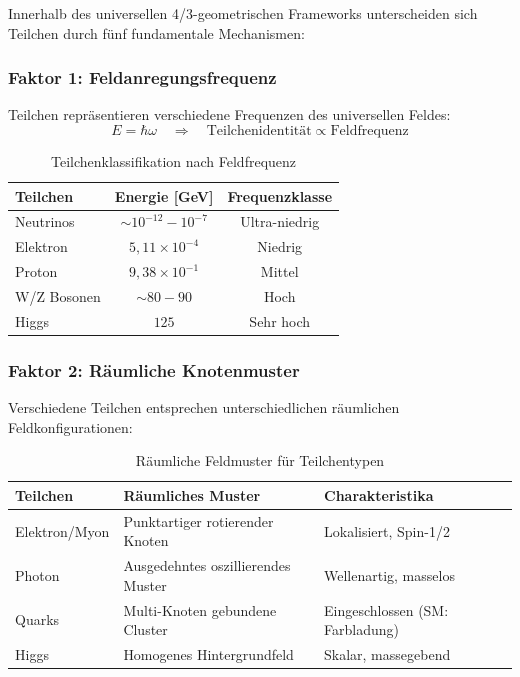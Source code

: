 	Innerhalb des universellen 4/3-geometrischen Frameworks unterscheiden sich Teilchen durch fünf fundamentale Mechanismen:
	
	\subsubsection{Faktor 1: Feldanregungsfrequenz}
	\label{subsubsec:anregungsfrequenz}
	
	Teilchen repräsentieren verschiedene Frequenzen des universellen Feldes:
	\begin{equation}
		E = \hbar \omega \quad \Rightarrow \quad \text{Teilchenidentität} \propto \text{Feldfrequenz}
		\label{eq:frequenz_identitaet}
	\end{equation}
	
	\begin{table}[htbp]
		\centering
		\begin{tabular}{lcc}
			\toprule
			\textbf{Teilchen} & \textbf{Energie [GeV]} & \textbf{Frequenzklasse} \\
			\midrule
			Neutrinos & $\sim 10^{-12} - 10^{-7}$ & Ultra-niedrig \\
			Elektron & $5{,}11 \times 10^{-4}$ & Niedrig \\
			Proton & $9{,}38 \times 10^{-1}$ & Mittel \\
			W/Z Bosonen & $\sim 80-90$ & Hoch \\
			Higgs & $125$ & Sehr hoch \\
			\bottomrule
		\end{tabular}
		\caption{Teilchenklassifikation nach Feldfrequenz}
		\label{tab:frequenz_klassifikation}
	\end{table}
	
	\subsubsection{Faktor 2: Räumliche Knotenmuster}
	\label{subsubsec:raeumliche_muster}
	
	Verschiedene Teilchen entsprechen unterschiedlichen räumlichen Feldkonfigurationen:
	
	\begin{table}[htbp]
		\centering
		\begin{tabular}{lp{5cm}p{4cm}}
			\toprule
			\textbf{Teilchen} & \textbf{Räumliches Muster} & \textbf{Charakteristika} \\
			\midrule
			Elektron/Myon & Punktartiger rotierender Knoten & Lokalisiert, Spin-1/2 \\
			Photon & Ausgedehntes oszillierendes Muster & Wellenartig, masselos \\
			Quarks & Multi-Knoten gebundene Cluster & Eingeschlossen (SM: Farbladung) \\
			Higgs & Homogenes Hintergrundfeld & Skalar, massegebend \\
			\bottomrule
		\end{tabular}
		\caption{Räumliche Feldmuster für Teilchentypen}
		\label{tab:raeumliche_feldmuster}
	\end{table}
	
